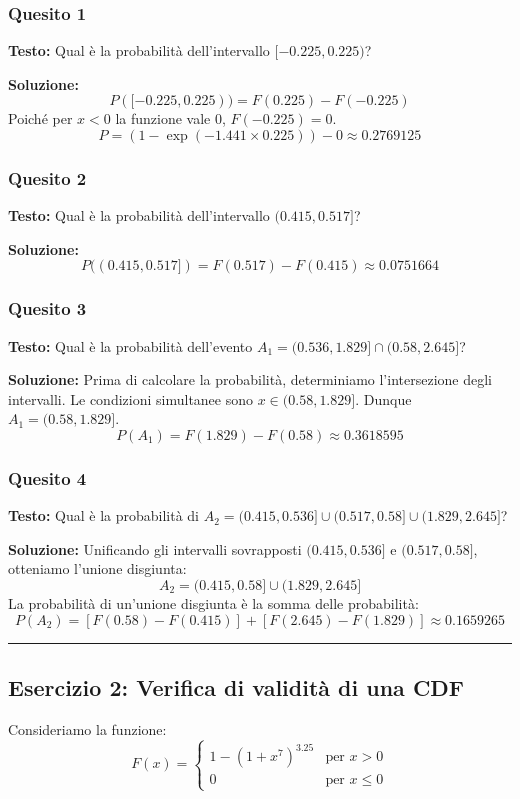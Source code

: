 \documentclass[12pt, a4paper]{article}
\begin{document}
\subsubsection*{Quesito 1}
\textbf{Testo:} Qual è la probabilità dell'intervallo $[-0.225, 0.225)$?

\textbf{Soluzione:}
$$P([-0.225, 0.225)) = F(0.225) - F(-0.225)$$
Poiché per $x < 0$ la funzione vale 0, $F(-0.225) = 0$.
$$P = (1 - \exp(-1.441 \times 0.225)) - 0 \approx 0.2769125$$

\subsubsection*{Quesito 2}
\textbf{Testo:} Qual è la probabilità dell'intervallo $(0.415, 0.517]$?

\textbf{Soluzione:}
$$P((0.415, 0.517]) = F(0.517) - F(0.415) \approx 0.0751664$$

\subsubsection*{Quesito 3}
\textbf{Testo:} Qual è la probabilità dell'evento $A_1 = (0.536, 1.829] \cap (0.58, 2.645]$?

\textbf{Soluzione:}
Prima di calcolare la probabilità, determiniamo l'intersezione degli intervalli. Le condizioni simultanee sono $x \in (0.58, 1.829]$. Dunque $A_1 = (0.58, 1.829]$.
$$P(A_1) = F(1.829) - F(0.58) \approx 0.3618595$$

\subsubsection*{Quesito 4}
\textbf{Testo:} Qual è la probabilità di $A_2 = (0.415, 0.536] \cup (0.517, 0.58] \cup (1.829, 2.645]$?

\textbf{Soluzione:}
Unificando gli intervalli sovrapposti $(0.415, 0.536]$ e $(0.517, 0.58]$, otteniamo l'unione disgiunta:
$$A_2 = (0.415, 0.58] \cup (1.829, 2.645]$$
La probabilità di un'unione disgiunta è la somma delle probabilità:
$$P(A_2) = [F(0.58) - F(0.415)] + [F(2.645) - F(1.829)] \approx 0.1659265$$

\vspace{0.5cm}\hrule\vspace{0.5cm}

\subsection*{Esercizio 2: Verifica di validità di una CDF}
Consideriamo la funzione:
$$
F(x) = 
\begin{cases} 
1 - (1+x^7)^{3.25} & \text{per } x > 0 \\
0 & \text{per } x \le 0
\end{cases}
$$
\end{document}
